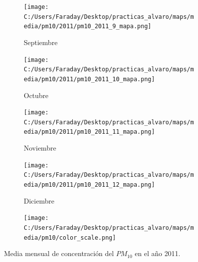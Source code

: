 \documentclass[12pt]{beamer}
\begin{document}
\begin{frame}[squeeze]
\begin{figure}[H]
\begin{subfigure}[H]{0.20\textwidth}
\texttt{[image: C:/Users/Faraday/Desktop/practicas\_alvaro/maps/media/pm10/2011/pm10\_2011\_9\_mapa.png]}
\captionsetup{labelformat=empty}
\caption{\scriptsize Septiembre}
\label{fig:map-pm10-2011-9}
\end{subfigure}
%
\begin{subfigure}[H]{0.20\textwidth}
\texttt{[image: C:/Users/Faraday/Desktop/practicas\_alvaro/maps/media/pm10/2011/pm10\_2011\_10\_mapa.png]}
\captionsetup{labelformat=empty}
\caption{\scriptsize Octubre}
\label{fig:map-pm10-2011-10}
\end{subfigure}
%
\begin{subfigure}[H]{0.20\textwidth}
\texttt{[image: C:/Users/Faraday/Desktop/practicas\_alvaro/maps/media/pm10/2011/pm10\_2011\_11\_mapa.png]}
\captionsetup{labelformat=empty}
\caption{\scriptsize Noviembre}
\label{fig:map-pm10-2011-11}
\end{subfigure}
%
\begin{subfigure}[H]{0.20\textwidth}
\texttt{[image: C:/Users/Faraday/Desktop/practicas\_alvaro/maps/media/pm10/2011/pm10\_2011\_12\_mapa.png]}
\captionsetup{labelformat=empty}
\caption{\scriptsize Diciembre}
\label{fig:map-pm10-2011-12}
\end{subfigure}

\begin{subfigure}[H]{0.45\textwidth}
\texttt{[image: C:/Users/Faraday/Desktop/practicas\_alvaro/maps/media/pm10/color\_scale.png]}
\captionsetup{labelformat=empty}
\caption{}
\end{subfigure}

\vspace*{-7mm}
\caption{\scriptsize Media mensual de concentración del $PM_{10}$ en el año 2011.}
\label{fig:map-pm10-2011}
\end{figure}
\end{frame}
\end{document}
